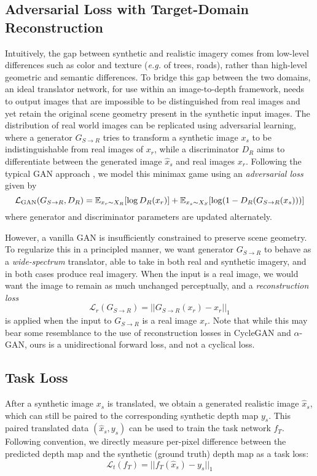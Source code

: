\documentclass[runningheads]{llncs}
\def\eg{\emph{e.g.}\xspace}
\begin{document}
\subsection{Adversarial Loss with Target-Domain Reconstruction}

Intuitively, the gap between synthetic and realistic imagery comes from low-level differences such as color and texture (\eg of trees, roads), rather than high-level geometric and semantic differences. To bridge this gap between the two domains, an ideal translator network, for use within an image-to-depth framework, needs to output images that are impossible to be distinguished from real images and yet retain the original scene geometry present in the synthetic input images. The distribution of real world images can be replicated using adversarial learning, where a generator $G_{S\to R}$ tries to transform a synthetic image $x_s$ to be indistinguishable from real images of $x_r$, while a discriminator $D_R$ aims to differentiate between the generated image $\hat{x}_s$ and real images $x_r$. Following the typical GAN approach \cite{goodfellow2014generative}, we model this minimax game using an \emph{adversarial loss} given by
\begin{equation} \label{eq:1}
\small
\mathcal{L}_{\text{GAN}}(G_{S\to R}, D_R) = \mathbb{E}_{x_r\sim X_R}[\log D_R(x_r)] + \mathbb{E}_{x_s\sim X_S}[\log(1-D_R(G_{S\to R}(x_s)))]
\end{equation}
where generator and discriminator parameters are updated alternately.

However, a vanilla GAN is insufficiently constrained to preserve scene geometry. To regularize this in a principled manner, we want generator $G_{S\to R}$ to behave as a \emph{wide-spectrum} translator, able to take in both real and synthetic imagery, and in both cases produce real imagery. When the input is a real image, we would want the image to remain as much unchanged perceptually, and a \emph{reconstruction loss}
\begin{equation}\label{eq:2}
\mathcal{L}_{r}(G_{S\to R}) = ||G_{S\to R}(x_r) - x_r||_1
\end{equation}
is applied when the input to $G_{S\to R}$ is a real image $x_r$. Note that while this may bear some resemblance to the use of reconstruction losses in CycleGAN \cite{zhu2017unpaired} and $\alpha$-GAN\cite{rosca2017variational}, ours is a unidirectional forward loss, and not a cyclical loss. 

\subsection{Task Loss}
After a synthetic image $x_s$ is translated, we obtain a generated realistic image $\hat{x}_s$, which can still be paired to the corresponding synthetic depth map $y_s$. This paired translated data $(\hat{x}_s, y_s)$ can be used to train the task network $f_T$. Following convention, we directly measure per-pixel difference between the predicted depth map and the synthetic (ground truth) depth map as a task loss:
\begin{equation}\label{eq:3}
\mathcal{L}_{t}(f_T) = ||f_T(\hat{x}_s)-y_s||_1
\end{equation}
\end{document}
